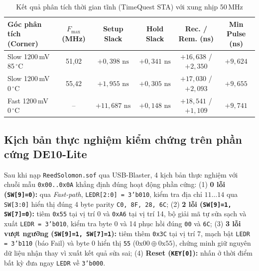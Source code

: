 \begin{table}[!htb]
    \centering
    \caption{Kết quả phân tích thời gian tĩnh (TimeQuest STA) với xung nhịp 50\,MHz}
    \label{tab:sta-results}
    \footnotesize
    \setlength{\tabcolsep}{4pt}
    \renewcommand{\arraystretch}{1.1}
    \begin{tabular}{l c c c c c}
        \toprule
        \textbf{Góc phân tích (Corner)} & \textbf{$F_{\max}$ (MHz)} & \textbf{Setup Slack} & \textbf{Hold Slack} & \textbf{Rec. / Rem. (ns)} & \textbf{Min Pulse (ns)} \\
        \midrule
        Slow 1200\,mV 85\,$^{\circ}\text{C}$ & 51,02 & $+0{,}398\text{ ns}$ & $+0{,}341\text{ ns}$ & $+16{,}638$ / $+2{,}350$ & $+9{,}624$ \\
        Slow 1200\,mV 0\,$^{\circ}\text{C}$ & 55,42 & $+1{,}955\text{ ns}$ & $+0{,}305\text{ ns}$ & $+17{,}030$ / $+2{,}093$ & $+9{,}655$ \\
        Fast 1200\,mV 0\,$^{\circ}\text{C}$ & -- & $+11{,}687\text{ ns}$ & $+0{,}148\text{ ns}$ & $+18{,}541$ / $+1{,}109$ & $+9{,}741$ \\
        \bottomrule
    \end{tabular}
\end{table}

\subsection*{Kịch bản thực nghiệm kiểm chứng trên phần cứng DE10-Lite}
Sau khi nạp \texttt{ReedSolomon.sof} qua USB-Blaster, 4 kịch bản thực nghiệm với chuỗi mẫu \texttt{0x00..0x0A} khẳng định đúng hoạt động phần cứng:
(1) \textbf{0 lỗi (\texttt{SW[9]=0}):} qua \textit{Fast-path}, \texttt{LEDR[2:0] = 3'b010}, kiểm tra địa chỉ $11\dots 14$ qua \texttt{SW[3:0]} hiển thị đúng 4 byte parity \texttt{C0, 8F, 28, 6C};
(2) \textbf{2 lỗi (\texttt{SW[9]=1, SW[7]=0}):} tiêm \texttt{0x55} tại vị trí 0 và \texttt{0xA6} tại vị trí 14, bộ giải mã tự sửa sạch và xuất \texttt{LEDR = 3'b010}, kiểm tra byte 0 và 14 phục hồi đúng \texttt{00} và \texttt{6C};
(3) \textbf{3 lỗi vượt ngưỡng (\texttt{SW[9]=1, SW[7]=1}):} tiêm thêm \texttt{0x3C} tại vị trí 7, mạch bật \texttt{LEDR = 3'b110} (báo Fail) và byte 0 hiển thị \texttt{55} ($0\text{x00}\oplus 0\text{x55}$), chứng minh giữ nguyên dữ liệu nhận thay vì xuất kết quả sửa sai;
(4) \textbf{Reset (\texttt{KEY[0]}):} nhấn ở thời điểm bất kỳ đưa ngay \texttt{LEDR} về \texttt{3'b000}.


